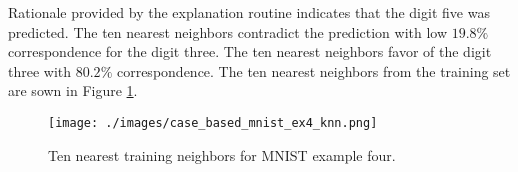 Rationale provided by the explanation routine indicates that the digit five was
predicted. The ten nearest neighbors contradict the prediction with low $19.8\%$
correspondence for the digit three. The ten nearest neighbors favor of the digit
three with $80.2\%$ correspondence. The ten nearest neighbors from the training
set are sown in Figure \ref{fig:mnist_case_based_ex4_knn}.


\begin{figure}[H]
    \centerline{\texttt{[image: ./images/case\_based\_mnist\_ex4\_knn.png]}}
    \caption{Ten nearest training neighbors for MNIST example four.}
    \label{fig:mnist_case_based_ex4_knn}
\end{figure}
